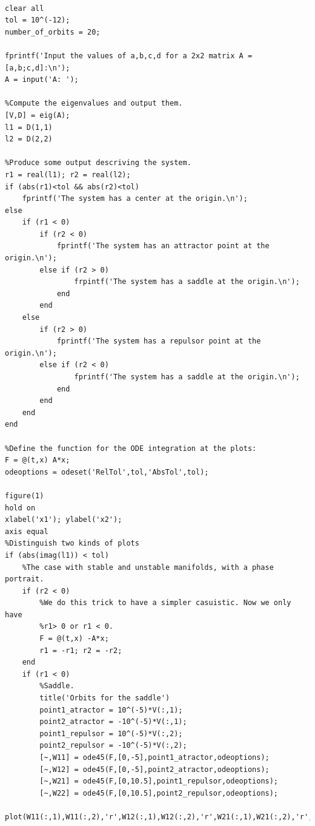 \documentclass[twoside]{article}
\begin{document}
\begin{verbatim}

clear all
tol = 10^(-12);
number_of_orbits = 20;

fprintf('Input the values of a,b,c,d for a 2x2 matrix A = [a,b;c,d]:\n');
A = input('A: ');

%Compute the eigenvalues and output them.
[V,D] = eig(A);
l1 = D(1,1)
l2 = D(2,2)

%Produce some output descriving the system.
r1 = real(l1); r2 = real(l2);
if (abs(r1)<tol && abs(r2)<tol)
    fprintf('The system has a center at the origin.\n');
else
    if (r1 < 0) 
        if (r2 < 0)
            fprintf('The system has an attractor point at the origin.\n');
        else if (r2 > 0)
                frpintf('The system has a saddle at the origin.\n');
            end
        end
    else
        if (r2 > 0)
            fprintf('The system has a repulsor point at the origin.\n');
        else if (r2 < 0)
                fprintf('The system has a saddle at the origin.\n');
            end
        end
    end
end

%Define the function for the ODE integration at the plots:
F = @(t,x) A*x;
odeoptions = odeset('RelTol',tol,'AbsTol',tol);

figure(1)
hold on
xlabel('x1'); ylabel('x2');
axis equal
%Distinguish two kinds of plots
if (abs(imag(l1)) < tol)
    %The case with stable and unstable manifolds, with a phase portrait.
    if (r2 < 0)
        %We do this trick to have a simpler casuistic. Now we only have
        %r1> 0 or r1 < 0.
        F = @(t,x) -A*x;
        r1 = -r1; r2 = -r2;
    end
    if (r1 < 0)
        %Saddle.
        title('Orbits for the saddle')
        point1_atractor = 10^(-5)*V(:,1);
        point2_atractor = -10^(-5)*V(:,1);
        point1_repulsor = 10^(-5)*V(:,2);
        point2_repulsor = -10^(-5)*V(:,2);
        [~,W11] = ode45(F,[0,-5],point1_atractor,odeoptions);
        [~,W12] = ode45(F,[0,-5],point2_atractor,odeoptions);
        [~,W21] = ode45(F,[0,10.5],point1_repulsor,odeoptions);
        [~,W22] = ode45(F,[0,10.5],point2_repulsor,odeoptions);
        plot(W11(:,1),W11(:,2),'r',W12(:,1),W12(:,2),'r',W21(:,1),W21(:,2),'r',W22(:,1),W22(:,2),'r');
        

\end{verbatim}
\end{document}
